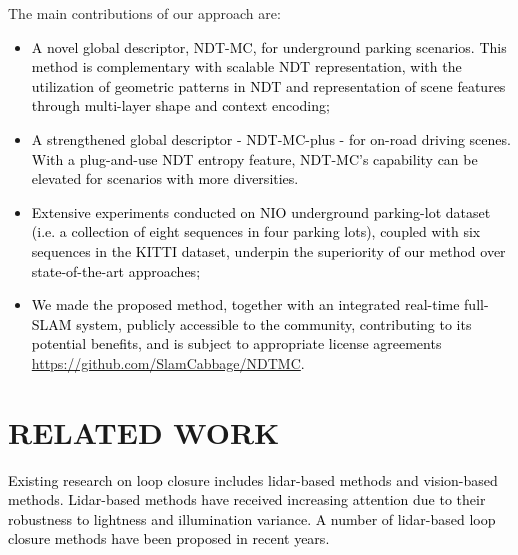 \documentclass[letterpaper, 10 pt, conference]{ieeeconf}   %
\newcommand\kevin[1]{\textcolor{black}{#1}}
\begin{document}
The main contributions of our approach are:
\begin{itemize}
   \item
    \kevin{A novel global descriptor, NDT-MC, for underground parking scenarios. This method is complementary with scalable NDT representation, with the utilization of geometric patterns in NDT and representation of scene features through multi-layer shape and context encoding;}
   \item
   \kevin{A strengthened global descriptor - NDT-MC-plus - for on-road driving scenes. With a plug-and-use NDT entropy feature, NDT-MC's capability can be elevated  
   for scenarios with more diversities. }
   \item
   \kevin{Extensive experiments conducted on NIO underground parking-lot dataset (i.e. a collection of eight sequences in four parking lots), coupled with six sequences in the KITTI dataset, underpin the superiority of our method over state-of-the-art approaches;}
   \item 
   \kevin{We made the proposed method, together with an integrated real-time full-SLAM system, publicly accessible to the community, contributing to its potential benefits, and is subject to appropriate license agreements \url{https://github.com/SlamCabbage/NDTMC}.}
\end{itemize}


\section{RELATED WORK}

\kevin{Existing research on loop closure includes lidar-based methods and vision-based methods. Lidar-based methods have received increasing attention due to their robustness to lightness and illumination variance. A number of lidar-based loop closure methods have been proposed in recent years.}

\end{document}
